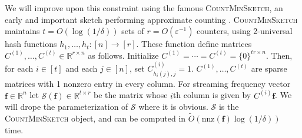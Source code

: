 \documentclass{report}
\newcommand{\algoname}[1]{\textnormal{\textsc{#1}}}
\newcommand{\nnz}{\mathrm{nnz}}
\begin{document}
We will improve upon this constraint using the famous \algoname{CountMinSketch}, an early and important sketch performing approximate counting \cite{cormode2005improved}. 
\algoname{CountMinSketch} maintains 
$t = O(\log (1/\delta))$ sets of 
$r = O(\varepsilon^{-1})$ counters, using 2-universal hash functions $h_1, \dots, h_t: [n] \rightarrow [r]$.
These function define matrices $C^{(1)}, \dots, C^{(t)} \in \mathbb{R}^{r \times n}$ as follows.
Initialize $C^{(1)} = \cdots = C^{(t)} = \{0\}^{tr \times n}$.
Then, for each $i \in [t]$ and each $j \in [n]$, set $C^{(i)}_{h_i(j),j} = 1$. 
$C^{(1)}, \dots, C^{(t)}$ are sparse matrices with 1 nonzero entry in every column. 
For streaming frequency vector $\mathbf{f} \in \mathbb{R}^n$ let $\mathcal{S}(\mathbf{f}) \in \mathbb{R}^{t \times r}$ be the matrix whose $i$th column is given by $C^{(i)}\mathbf{f}$.
We will drope the parameterization of $\mathcal{S}$ where it is obvious.
$\mathcal{S}$ is the \algoname{CountMinSketch} object, and can be computed in $\widetilde{O}(\nnz(\mathbf{f}) \log (1 /\delta))$ time. 
\end{document}

